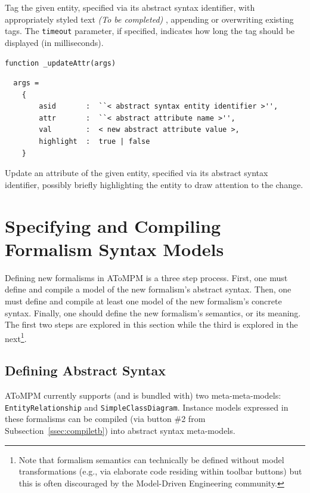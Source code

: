 \documentclass{article}
\numberwithin{equation}{section}
\numberwithin{figure}{section}
\newcommand{\TBC}{\textit{(To be completed) }}
\begin{document}
Tag the given entity, specified via its abstract syntax identifier, with appropriately styled text \TBC, appending or overwriting existing tags. The \texttt{timeout} parameter, if specified, indicates how long the tag should be displayed (in milliseconds).\\
\vspace*{1em}


\begin{center}	{\large \texttt{function \_updateAttr(args)}} \end{center}
\begin{verbatim}
  args = 
    {
        asid       :  ``< abstract syntax entity identifier >'',
        attr       :  ``< abstract attribute name >'',
        val        :  < new abstract attribute value >,
        highlight  :  true | false        
    }
\end{verbatim}

Update an attribute of the given entity, specified via its abstract syntax identifier, possibly briefly highlighting the entity to draw attention to the change.\\





\newpage
\section{Specifying and Compiling Formalism Syntax Models} 
\label{sec:mm}
Defining new formalisms in AToMPM is a three step process. First, one must define and compile a model of the new formalism's abstract syntax. Then, one must define and compile at least one model of the new formalism's concrete syntax. Finally, one should define the new formalism's semantics, or its meaning. The first two steps are explored in this section while the third is explored in the next\footnote{Note that formalism semantics can technically be defined without model transformations (e.g., via elaborate code residing within toolbar buttons) but this is often discouraged by the Model-Driven Engineering community.}.



\subsection{Defining Abstract Syntax}
AToMPM currently supports (and is bundled with) two meta-meta-models: \texttt{EntityRelationship} and \texttt{SimpleClassDiagram}. Instance models expressed in these formalisms can be compiled (via button \#2 from Subsection~\ref{ssec:compiletb}) into abstract syntax meta-models.\\
\end{document}

